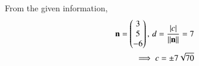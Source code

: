 From the given information, 
\begin{align} 
\mathbf{n}=\begin{pmatrix}3\\5\\-6\end{pmatrix},\,
	d=\frac{\left\vert c\right\vert}{\left\lVert\mathbf{n}\right\rVert} = 7
	\\
	\implies
c =\pm7\sqrt{70}
\end{align}	  
